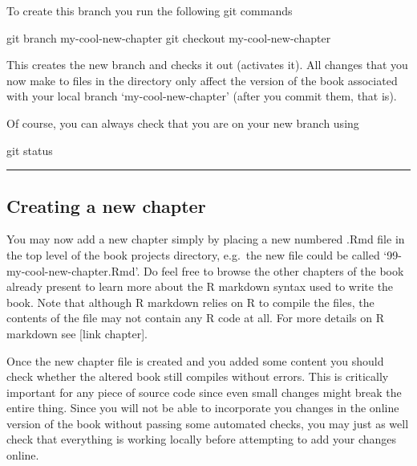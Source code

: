 \documentclass[]{book}
\newenvironment{Shaded}{\begin{snugshade}}{\end{snugshade}}
\newcommand{\FunctionTok}[1]{\textcolor[rgb]{0.00,0.00,0.00}{#1}}
\newcommand{\NormalTok}[1]{#1}
\begin{document}
To create this branch you run the following git commands

\begin{Shaded}
\begin{Highlighting}[]
\FunctionTok{git}\NormalTok{ branch my-cool-new-chapter}
\FunctionTok{git}\NormalTok{ checkout my-cool-new-chapter}
\end{Highlighting}
\end{Shaded}

This creates the new branch and checks it out (activates it). All
changes that you now make to files in the directory only affect the
version of the book associated with your local branch
`my-cool-new-chapter' (after you commit them, that is).

Of course, you can always check that you are on your new branch using

\begin{Shaded}
\begin{Highlighting}[]
\FunctionTok{git}\NormalTok{ status}
\end{Highlighting}
\end{Shaded}

\begin{center}\rule{0.5\linewidth}{\linethickness}\end{center}

\subsection{Creating a new chapter}\label{creating-a-new-chapter}

You may now add a new chapter simply by placing a new numbered .Rmd file
in the top level of the book projects directory, e.g.~the new file could
be called `99-my-cool-new-chapter.Rmd'. Do feel free to browse the other
chapters of the book already present to learn more about the R markdown
syntax used to write the book. Note that although R markdown relies on R
to compile the files, the contents of the file may not contain any R
code at all. For more details on R markdown see {[}link chapter{]}.

Once the new chapter file is created and you added some content you
should check whether the altered book still compiles without errors.
This is critically important for any piece of source code since even
small changes might break the entire thing. Since you will not be able
to incorporate you changes in the online version of the book without
passing some automated checks, you may just as well check that
everything is working locally before attempting to add your changes
online.
\end{document}
